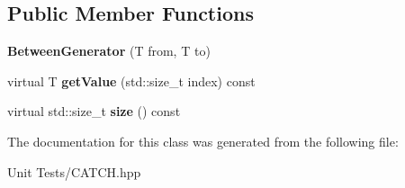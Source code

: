 \subsection*{Public Member Functions}
\begin{DoxyCompactItemize}
\item 
{\bfseries Between\+Generator} (T from, T to)\hypertarget{classCatch_1_1BetweenGenerator_a835a057d691ae37caef660624099b51c}{}\label{classCatch_1_1BetweenGenerator_a835a057d691ae37caef660624099b51c}

\item 
virtual T {\bfseries get\+Value} (std\+::size\+\_\+t index) const \hypertarget{classCatch_1_1BetweenGenerator_af83575d62cc727ca995446cff4d6c26c}{}\label{classCatch_1_1BetweenGenerator_af83575d62cc727ca995446cff4d6c26c}

\item 
virtual std\+::size\+\_\+t {\bfseries size} () const \hypertarget{classCatch_1_1BetweenGenerator_aa53a04a259e796ba2b5adabed79474b5}{}\label{classCatch_1_1BetweenGenerator_aa53a04a259e796ba2b5adabed79474b5}

\end{DoxyCompactItemize}


The documentation for this class was generated from the following file\+:\begin{DoxyCompactItemize}
\item 
Unit Tests/C\+A\+T\+C\+H.\+hpp\end{DoxyCompactItemize}
